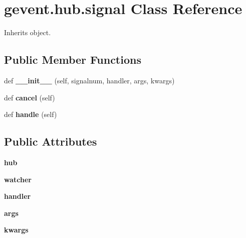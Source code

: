 \hypertarget{classgevent_1_1hub_1_1signal}{}\section{gevent.\+hub.\+signal Class Reference}
\label{classgevent_1_1hub_1_1signal}


Inherits object.

\subsection*{Public Member Functions}
\begin{DoxyCompactItemize}
\item 
\mbox{\label{classgevent_1_1hub_1_1signal_ae568d254f6f97364661fc097b0dd4ace}} 
def {\bfseries \+\_\+\+\_\+init\+\_\+\+\_\+} (self, signalnum, handler, args, kwargs)
\item 
\mbox{\label{classgevent_1_1hub_1_1signal_adbf800135a115da3154adb373d8df069}} 
def {\bfseries cancel} (self)
\item 
\mbox{\label{classgevent_1_1hub_1_1signal_af682f147101c8903f8cea0c672977a19}} 
def {\bfseries handle} (self)
\end{DoxyCompactItemize}
\subsection*{Public Attributes}
\begin{DoxyCompactItemize}
\item 
\mbox{\label{classgevent_1_1hub_1_1signal_af7c2560079297ae03cece12130cdf338}} 
{\bfseries hub}
\item 
\mbox{\label{classgevent_1_1hub_1_1signal_a13094744e750ba79212e791dce881020}} 
{\bfseries watcher}
\item 
\mbox{\label{classgevent_1_1hub_1_1signal_ab330fe540f70c9a3adebbddc32636303}} 
{\bfseries handler}
\item 
\mbox{\label{classgevent_1_1hub_1_1signal_ad8d5ea3086de5d0a9aba353a7db145e4}} 
{\bfseries args}
\item 
\mbox{\label{classgevent_1_1hub_1_1signal_a6de447669914ca8390e8336bab58a1c5}} 
{\bfseries kwargs}
\end{DoxyCompactItemize}
